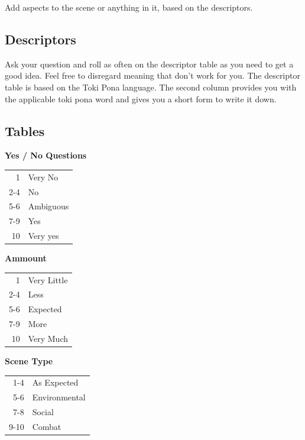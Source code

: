 \documentclass[11pt]{article}
\begin{document}
{Add aspects to the scene or anything in it, based on the descriptors.
\subsection{Descriptors}
\label{sec:org8433ba0}

Ask your question and roll as often on the descriptor table as you need to get a good idea. Feel free to disregard meaning that don't work for you.
The descriptor table is based on the Toki Pona language. The second column provides you with the applicable toki pona word and gives you a short form to write it down. 


\newpage
\subsection{Tables}
\label{sec:org2f9dd7e}
\begin{multicols}{3}[]
\begin{center}
\textbf{Yes / No Questions}
\begin{center}
\begin{tabular}{rl}
1 & Very No\\
2-4 & No\\
5-6 & Ambiguous\\
7-9 & Yes\\
10 & Very yes\\
\end{tabular}
\end{center}
\columnbreak
\textbf{Ammount}
\begin{center}
\begin{tabular}{rl}
1 & Very Little\\
2-4 & Less\\
5-6 & Expected\\
7-9 & More\\
10 & Very Much\\
\end{tabular}
\end{center}
\columnbreak
\textbf{Scene Type}
\begin{center}
\begin{tabular}{rl}
1-4 & As Expected\\
5-6 & Environmental\\
7-8 & Social\\
9-10 & Combat\\
\end{tabular}
\end{center}
\end{center}
\end{multicols}


}
\end{document}
